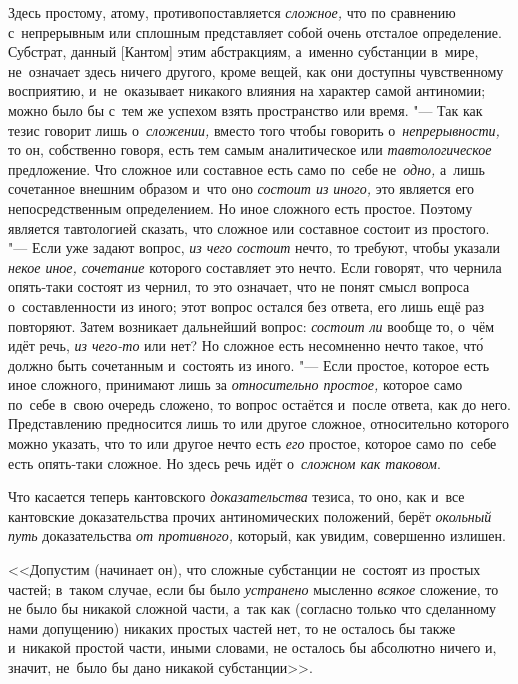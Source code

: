 Здесь простому, атому, противопоставляется {\em сложное,} что по сравнению
с~непрерывным или сплошным представляет собой очень отсталое определение.
Субстрат, данный [Кантом] этим абстракциям, а~именно субстанции в~мире,
не~означает здесь ничего другого, кроме вещей, как они доступны чувственному
восприятию, и~не~оказывает никакого влияния на характер самой антиномии; можно
было бы с~тем же успехом взять пространство или время. "--- Так как тезис
говорит лишь о~{\em сложении,} вместо того чтобы говорить
о~{\em непрерывности,} то он, собственно говоря, есть тем самым аналитическое
или {\em тавтологическое} предложение. Что сложное или составное есть само
по~себе не~{\em одно,} а~лишь сочетанное внешним образом и~что оно
{\em состоит из иного,} это является его непосредственным определением.
Но иное сложного есть простое. Поэтому является тавтологией сказать, что
сложное или составное состоит из простого. "--- Если уже задают вопрос,
{\em из чего состоит} нечто, то требуют, чтобы указали
{\em некое иное, сочетание} которого составляет это нечто. Если говорят, что
чернила опять-таки состоят из чернил, то это означает, что не понят смысл
вопроса о~составленности из иного; этот вопрос остался без ответа, его лишь
ещё раз повторяют. Затем возникает дальнейший вопрос: {\em состоит ли} вообще
то, о~чём идёт речь, {\em из чего-то} или нет? Но сложное есть несомненно нечто
такое, чт\'{о} должно быть сочетанным и~состоять из иного. "--- Если простое,
которое есть иное сложного, принимают лишь за {\em относительно простое,}
которое само по~себе в~свою очередь сложено, то вопрос остаётся и~после
ответа, как до него. Представлению предносится лишь то или другое сложное,
относительно которого можно указать, что то или другое нечто есть
{\em его} простое, которое само по~себе есть опять-таки сложное. Но здесь
речь идёт о~{\em сложном как таковом}.

Что касается теперь кантовского {\em доказательства}
тезиса, то оно, как и~все кантовские доказательства прочих антиномических
положений, берёт {\em окольный путь} доказательства
{\em от противного,} который, как увидим, совершенно излишен.

<<Допустим (начинает он), что сложные субстанции не~состоят из простых частей;
в~таком случае, если бы было {\em устранено} мысленно {\em всякое} сложение, то
не было бы никакой сложной части, а~так как (согласно только что сделанному
нами допущению) никаких простых частей нет, то не осталось бы также и~никакой
простой части, иными словами, не осталось бы абсолютно ничего и, значит,
не~было бы дано никакой субстанции>>.

